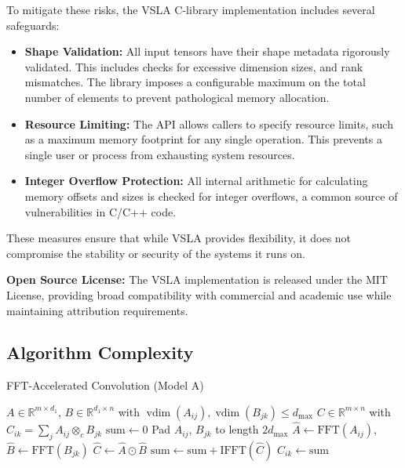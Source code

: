 \documentclass[11pt]{article}
\newcommand{\vdim}{\operatorname{vdim}}
\begin{document}
To mitigate these risks, the VSLA C-library implementation includes several safeguards:
\begin{itemize}
    \item \textbf{Shape Validation:} All input tensors have their shape metadata rigorously validated. This includes checks for excessive dimension sizes, and rank mismatches. The library imposes a configurable maximum on the total number of elements to prevent pathological memory allocation.
    \item \textbf{Resource Limiting:} The API allows callers to specify resource limits, such as a maximum memory footprint for any single operation. This prevents a single user or process from exhausting system resources.
    \item \textbf{Integer Overflow Protection:} All internal arithmetic for calculating memory offsets and sizes is checked for integer overflows, a common source of vulnerabilities in C/C++ code.
\end{itemize}

These measures ensure that while VSLA provides flexibility, it does not compromise the stability or security of the systems it runs on.

\textbf{Open Source License:} The VSLA implementation is released under the MIT License, providing broad compatibility with commercial and academic use while maintaining attribution requirements.

\subsection{Algorithm Complexity}

\begin{algorithm}
\caption{FFT-Accelerated Convolution (Model A)}
{\small
\begin{algorithmic}[1]
\REQUIRE $A \in \mathbb{R}^{m \times d_1}$, $B \in \mathbb{R}^{d_1 \times n}$ with $\vdim(A_{ij}), \vdim(B_{jk}) \leq d_{\max}$
\ENSURE $C \in \mathbb{R}^{m \times n}$ with $C_{ik} = \sum_j A_{ij} \otimes_c B_{jk}$
        \STATE $\text{sum} \leftarrow 0$
            \STATE Pad $A_{ij}$, $B_{jk}$ to length $2d_{\max}$
            \STATE $\hat{A} \leftarrow \text{FFT}(A_{ij})$, $\hat{B} \leftarrow \text{FFT}(B_{jk})$ 
            \STATE $\hat{C} \leftarrow \hat{A} \odot \hat{B}$ 
            \STATE $\text{sum} \leftarrow \text{sum} + \text{IFFT}(\hat{C})$
        \ENDFOR
        \STATE $C_{ik} \leftarrow \text{sum}$
    \ENDFOR
\ENDFOR
\end{algorithmic}
}
\end{algorithm}
\end{document}
